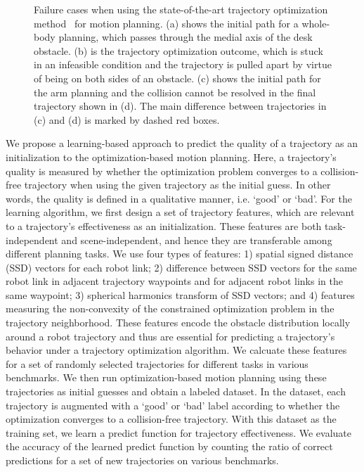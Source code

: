 \documentclass[letterpaper, 10 pt, conference]{ieeeconf}  %
\begin{document}
\begin{figure}[!h]
\caption{Failure cases when using the state-of-the-art trajectory optimization method~\cite{Schulman:2013:FLO} for motion planning. (a) shows the initial path for a whole-body planning, which passes through the medial axis of the desk obstacle. (b) is the trajectory optimization outcome, which is stuck in an infeasible condition and the trajectory is pulled apart by virtue of being on both sides of an obstacle. (c) shows the initial path for the arm planning and the collision cannot be resolved in the final trajectory shown in (d). The main difference between trajectories in (c) and (d) is marked by dashed red boxes.}
\label{fig:failexamples}
\end{figure}



We propose a learning-based approach to predict the quality of a trajectory as an initialization to the optimization-based motion planning. Here, a trajectory's quality is measured by whether the optimization problem converges to a collision-free trajectory when using the given trajectory as the initial guess. In other words, the quality is defined in a qualitative manner, i.e. `good' or `bad'.
For the learning algorithm, we first design a set of trajectory features, which are relevant to a trajectory's effectiveness as an initialization. These features are both task-independent and scene-independent, and hence they are transferable among different planning tasks. We use four types of features: 1) spatial signed distance (SSD) vectors for each robot link; 2) difference between SSD vectors for the same robot link in adjacent trajectory waypoints and for adjacent robot links in the same waypoint; 3) spherical harmonics transform of SSD vectors; and 4) features measuring the non-convexity of the constrained optimization problem in the trajectory neighborhood. These features encode the obstacle distribution locally around a robot trajectory and thus are essential for predicting a trajectory's behavior under a trajectory optimization algorithm. We calcuate these features for a set of randomly selected trajectories for different tasks in various benchmarks. We then run optimization-based motion planning using these trajectories as initial guesses and obtain a labeled dataset. In the dataset, each trajectory is augmented with a `good' or `bad' label according to whether the optimization converges to a collision-free trajectory. With this dataset as the training set, we learn a predict function for trajectory effectiveness. We evaluate the accuracy of the learned predict function by counting the ratio of correct predictions for a set of new trajectories on various benchmarks.
\end{document}

